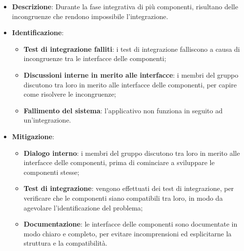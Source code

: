\label{risk:interfacce incoerenti}
\begin{itemize}
	\item \textbf{Descrizione}:
	      Durante la fase integrativa di più componenti, risultano delle
	      incongruenze che rendono impossibile l'integrazione.
	\item \textbf{Identificazione}:
	      \begin{itemize}
		      \item \textbf{Test di integrazione falliti}: i test di
		            integrazione falliscono a causa di incongruenze tra le
		            interfacce delle componenti;

		      \item \textbf{Discussioni interne in merito alle interfacce}: i
		            membri del gruppo discutono tra loro in merito alle
		            interfacce delle componenti, per capire come risolvere le
		            incongruenze;

		      \item \textbf{Fallimento del sistema}: l'applicativo non funziona
		            in seguito ad un'integrazione.

	      \end{itemize}
	\item \textbf{Mitigazione}:
	      \begin{itemize}
		      \item \textbf{Dialogo interno}: i membri del gruppo discutono tra loro
		            in merito alle interfacce delle componenti, prima di
		            cominciare a sviluppare le componenti stesse;

		      \item \textbf{Test di integrazione}: vengono effettuati dei test di
		            integrazione, per verificare che le componenti siano
		            compatibili tra loro, in modo da agevolare l'identificazione
		            del problema;

		      \item \textbf{Documentazione}: le interfacce delle componenti sono
		            documentate in modo chiaro e completo, per evitare
		            incomprensioni ed esplicitarne la struttura e la
		            compatibilità.
	      \end{itemize}
\end{itemize}
